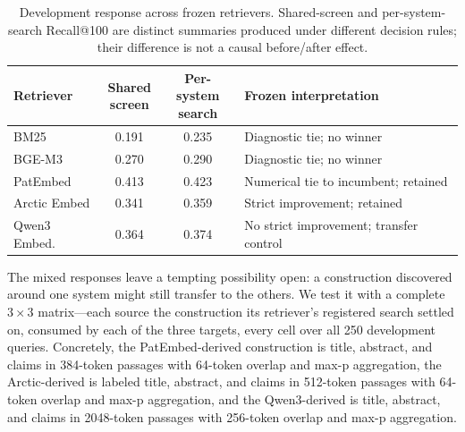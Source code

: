\documentclass[a4paper,conference]{IEEEtran}
\begin{document}
\begin{table}[!t]
\caption{Development response across frozen retrievers. Shared-screen and per-system-search Recall@100 are distinct summaries produced under different decision rules; their difference is not a causal before/after effect.}
\label{tab:development-response}
\centering
\footnotesize
\setlength{\tabcolsep}{2.1pt}
\begin{tabular}{@{}lccp{}@{}}
\toprule
Retriever & \shortstack{Shared\\screen} & \shortstack{Per-system\\search} & Frozen interpretation \\
\midrule
BM25 & 0.191 & 0.235 & Diagnostic tie; no winner \\
BGE-M3 & 0.270 & 0.290 & Diagnostic tie; no winner \\
PatEmbed & 0.413 & 0.423 & Numerical tie to incumbent; retained \\
Arctic Embed & 0.341 & 0.359 & Strict improvement; retained \\
Qwen3 Embed. & 0.364 & 0.374 & No strict improvement; transfer control \\
\bottomrule
\end{tabular}
\end{table}

The mixed responses leave a tempting possibility open: a construction discovered around one system might still transfer to the others. We test it with a complete $3\times3$ matrix---each source the construction its retriever's registered search settled on, consumed by each of the three targets, every cell over all 250 development queries. Concretely, the PatEmbed-derived construction is title, abstract, and claims in 384-token passages with 64-token overlap and max-p aggregation, the Arctic-derived is labeled title, abstract, and claims in 512-token passages with 64-token overlap and max-p aggregation, and the Qwen3-derived is title, abstract, and claims in 2048-token passages with 256-token overlap and max-p aggregation.
\end{document}

